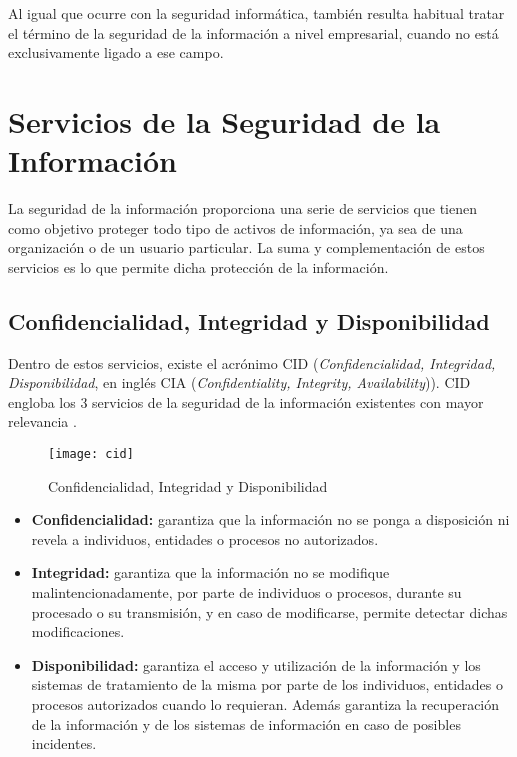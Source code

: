 Al igual que ocurre con la seguridad informática, también resulta habitual tratar el término de la seguridad de la información a nivel empresarial, cuando no está exclusivamente ligado a ese campo.


\section{Servicios de la Seguridad de la Información}
La seguridad de la información proporciona una serie de servicios que tienen como objetivo proteger todo tipo de activos de información, ya sea de una organización o de un usuario particular. La suma y complementación de estos servicios es lo que permite dicha protección de la información.

\subsection[CID]{Confidencialidad, Integridad y Disponibilidad}

Dentro de estos servicios, existe el acrónimo CID (\textit{Confidencialidad, Integridad, Disponibilidad}, en inglés CIA (\textit{Confidentiality, Integrity, Availability})). CID engloba los 3 servicios de la seguridad de la información existentes con mayor relevancia \cite{iso-27000}.

\begin{figure}[H]
	\centering
	\texttt{[image: cid]}
	\caption{Confidencialidad, Integridad y Disponibilidad}
	\label{fig:cid}
\end{figure}

\begin{itemize}
	\item \textbf{Confidencialidad:} garantiza que la información no se ponga a disposición ni revela a individuos, entidades o procesos no autorizados.
	\item \textbf{Integridad:} garantiza que la información no se modifique malintencionadamente, por parte de individuos o procesos, durante su procesado o su transmisión, y en caso de modificarse, permite detectar dichas modificaciones.
	\item \textbf{Disponibilidad:} garantiza el acceso y utilización de la información y los sistemas de tratamiento de la misma por parte de los individuos, entidades o procesos autorizados cuando lo requieran. Además garantiza la recuperación de la información y de los sistemas de información en caso de posibles incidentes.
\end{itemize}


